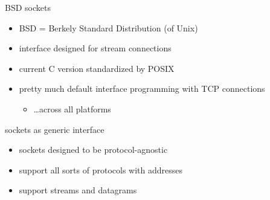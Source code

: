 \begin{frame}{BSD sockets}
    \begin{itemize}
    \item BSD = Berkely Standard Distribution (of Unix)
    \item interface designed for stream connections
    \item current C version standardized by POSIX
    \item pretty much default interface programming with TCP connections
        \begin{itemize}
        \item \ldots across all platforms
        \end{itemize}
    \end{itemize}
\end{frame}

\begin{frame}{sockets as generic interface}
    \begin{itemize}
    \item sockets designed to be protocol-agnostic
    \vspace{.5cm}
    \item support all sorts of protocols with addresses
    \item support streams and datagrams
    \end{itemize}
\end{frame}
